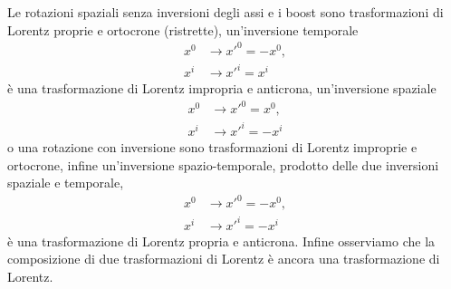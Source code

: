 Le rotazioni spaziali senza inversioni degli assi e i boost sono trasformazioni
di Lorentz proprie e ortocrone (ristrette), un'inversione temporale
\begin{subequations}
  \begin{align}
    x^{0} &\to x'^{0} = -x^{0}, \\
    x^{i} &\to x'^{i} = x^{i}
  \end{align}
\end{subequations}
è una trasformazione di Lorentz impropria e anticrona, un'inversione spaziale
\begin{subequations}
  \begin{align}
    x^{0} &\to x'^{0} = x^{0}, \\
    x^{i} &\to x'^{i} = - x^{i}
  \end{align}
\end{subequations}
o una rotazione con inversione sono trasformazioni di Lorentz improprie e
ortocrone, infine un'inversione spazio-temporale, prodotto delle due inversioni
spaziale e temporale,
\begin{subequations}
  \begin{align}
    x^{0} &\to x'^{0} = - x^{0}, \\
    x^{i} &\to x'^{i} = - x^{i}
  \end{align}
\end{subequations}
è una trasformazione di Lorentz propria e anticrona.  Infine osserviamo che la
composizione di due trasformazioni di Lorentz è ancora una trasformazione di
Lorentz.

\section{}
\label{sec:conseguenze-lorentz}

\subsection{}
\label{sec:contrazione-lunghezze}

\subsection{}
\label{sec:dilatazione-tempo}

